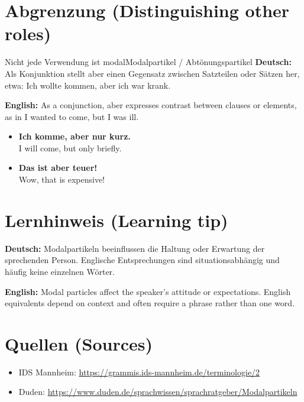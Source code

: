 \documentclass[a4paper,11pt]{article}
\newcommand{\GermanText}[1]{\textbf{Deutsch: }#1\par}
\newcommand{\EnglishText}[1]{{\small\color{SoftGray}\textbf{English: }#1\par}}
\newcommand{\ExampleItem}[2]{\item \textbf{#1}\\{\small\color{SoftGray}#2}}
\begin{document}
\section{Abgrenzung \textnormal{(Distinguishing other roles)}}
\begin{grammarentry}{Nicht jede Verwendung ist modal}{Modalpartikel / Abtönungspartikel}
\GermanText{Als Konjunktion stellt aber einen Gegensatz zwischen Satzteilen oder Sätzen her, etwa: Ich wollte kommen, aber ich war krank.}
\EnglishText{As a conjunction, aber expresses contrast between clauses or elements, as in I wanted to come, but I was ill.}
\end{grammarentry}
\begin{exbox}\begin{itemize}
\ExampleItem{Ich komme, aber nur kurz.}{I will come, but only briefly.}
\ExampleItem{Das ist aber teuer!}{Wow, that is expensive!}
\end{itemize}\end{exbox}
\section{Lernhinweis \textnormal{(Learning tip)}}
\GermanText{Modalpartikeln beeinflussen die Haltung oder Erwartung der sprechenden Person. Englische Entsprechungen sind situationsabhängig und häufig keine einzelnen Wörter.}
\EnglishText{Modal particles affect the speaker's attitude or expectations. English equivalents depend on context and often require a phrase rather than one word.}
\section{Quellen \textnormal{(Sources)}}
\begin{itemize}
\item IDS Mannheim: \url{https://grammis.ids-mannheim.de/terminologie/2}
\item Duden: \url{https://www.duden.de/sprachwissen/sprachratgeber/Modalpartikeln}
\end{itemize}
\end{document}
